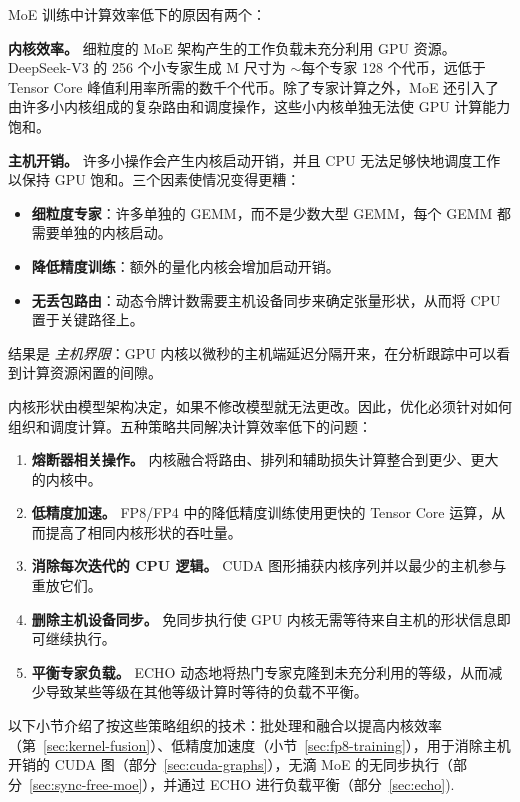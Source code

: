MoE 训练中计算效率低下的原因有两个：

\textbf{内核效率。} 细粒度的 MoE 架构产生的工作负载未充分利用 GPU 资源。 DeepSeek-V3 的 256 个小专家生成 M 尺寸为 $\sim$每个专家 128 个代币，远低于 Tensor Core 峰值利用率所需的数千个代币。除了专家计算之外，MoE 还引入了由许多小内核组成的复杂路由和调度操作，这些小内核单独无法使 GPU 计算能力饱和。

\textbf{主机开销。} 许多小操作会产生内核启动开销，并且 CPU 无法足够快地调度工作以保持 GPU 饱和。三个因素使情况变得更糟：
\begin{itemize}
    \item \textbf{细粒度专家}：许多单独的 GEMM，而不是少数大型 GEMM，每个 GEMM 都需要单独的内核启动。
    \item \textbf{降低精度训练}：额外的量化内核会增加启动开销。
    \item \textbf{无丢包路由}：动态令牌计数需要主机设备同步来确定张量形状，从而将 CPU 置于关键路径上。
\end{itemize}

结果是 \textit{主机界限}：GPU 内核以微秒的主机端延迟分隔开来，在分析跟踪中可以看到计算资源闲置的间隙。

内核形状由模型架构决定，如果不修改模型就无法更改。因此，优化必须针对如何组织和调度计算。五种策略共同解决计算效率低下的问题：

\begin{enumerate}
    \item \textbf{熔断器相关操作。} 内核融合将路由、排列和辅助损失计算整合到更少、更大的内核中。
    \item \textbf{低精度加速。} FP8/FP4 中的降低精度训练使用更快的 Tensor Core 运算，从而提高了相同内核形状的吞吐量。
    \item \textbf{消除每次迭代的 CPU 逻辑。} CUDA 图形捕获内核序列并以最少的主机参与重放它们。
    \item \textbf{删除主机设备同步。} 免同步执行使 GPU 内核无需等待来自主机的形状信息即可继续执行。
    \item \textbf{平衡专家负载。} ECHO 动态地将热门专家克隆到未充分利用的等级，从而减少导致某些等级在其他等级计算时等待的负载不平衡。
\end{enumerate}

以下小节介绍了按这些策略组织的技术：批处理和融合以提高内核效率（第~\ref{sec:kernel-fusion}）、低精度加速度（小节~\ref{sec:fp8-training}），用于消除主机开销的 CUDA 图（部分~\ref{sec:cuda-graphs}），无滴 MoE 的无同步执行（部分~\ref{sec:sync-free-moe}），并通过 ECHO 进行负载平衡（部分~\ref{sec:echo}).

